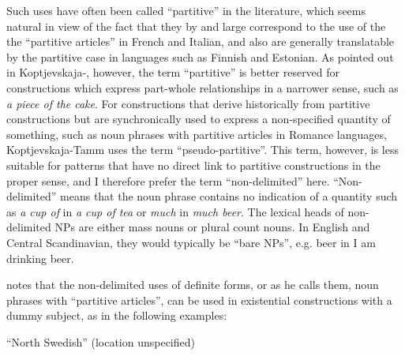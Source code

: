 \begin{styleBodytextC}
Such uses have often been called “partitive” in the literature, which seems natural in view of the fact that they by and large correspond to the use of the the “partitive articles” in French and Italian, and also are generally translatable by the partitive case in languages such as Finnish and Estonian. As pointed out in Koptjevskaja-\citet[525]{Tamm2001}, however, the term “partitive” is better reserved for constructions which express part-whole relationships in a narrower sense, such as \textit{a piece of the cake}. For constructions that derive historically from partitive constructions but are synchronically used to express a non-specified quantity of something, such as noun phrases with partitive articles in Romance languages, Koptjevskaja-Tamm uses the term “pseudo-partitive”. This term, however, is less suitable for patterns that have no direct link to partitive constructions in the proper sense, and I therefore prefer the term “non-delimited” here. “Non-delimited” means that the noun phrase contains no indication of a quantity such as \textit{a cup of} in \textit{a cup of tea }or \textit{much} in \textit{much beer}. The lexical heads of non-delimited NPs are either mass nouns or plural count nouns. In English and Central Scandinavian, they would typically be “bare NPs”, e.g. beer in I am drinking beer. 

\end{styleBodytextC}

\begin{styleBodytextC}
\citet[51]{Delsing1993} notes that the non-delimited uses of definite forms, or as he calls them, noun phrases with “partitive articles”, can be used in existential constructions with a dummy subject, as in the following examples: 

\end{styleBodytextC}


\begin{listWWNumileveli}
\item 

\begin{styleExample}
“North Swedish” (location unspecified)

\end{styleExample}

\end{listWWNumileveli}

\begin{listWWNumxxiiileveli}
\item 

\end{listWWNumxxiiileveli}

